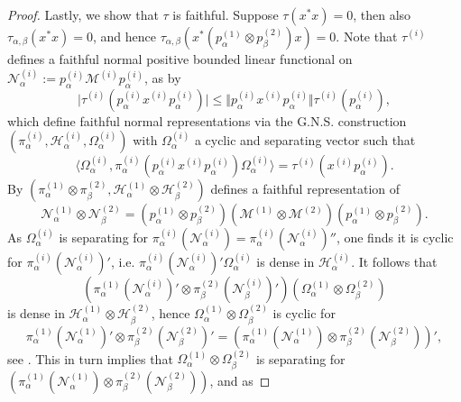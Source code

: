 \documentclass[sn-mathphys-num]{sn-jnl}%
\newcommand{\HH}{\mathcal{H}}
\newcommand{\MM}{\mathcal{M}}
\numberwithin{equation}{section}
\theoremstyle{thmstyleone}%
\theoremstyle{thmstyletwo}%
\theoremstyle{thmstylethree}%
\begin{document}
\begin{proof}
        Lastly, we show that $\tau$ is faithful. Suppose $\tau(x^*x)=0$, then also $\tau_{\alpha,\beta}(x^*x)=0$, and hence $\tau_{\alpha,\beta}(x^*(p_\alpha^{(1)}\otimes p_\beta^{(2)})x)=0$.
    Note that $\tau^{(i)}$ defines a faithful normal positive bounded linear functional on $\mathcal{N}^{(i)}_\alpha:=p_\alpha^{(i)}\MM^{(i)}p_\alpha^{(i)}$, as by \cite[Ch.\ V.2.\ Eq.\ (2)]{Takesaki2001}
    \begin{equation}
        \vert\tau^{(i)}(p_\alpha^{(i)}x^{(i)}p_\alpha^{(i)})\vert\leq \Vert p_\alpha^{(i)}x^{(i)}p_\alpha^{(i)}\Vert \tau^{(i)}(p_\alpha^{(i)}),
    \end{equation} which define faithful normal representations via the G.N.S. construction $(\pi_\alpha^{(i)},\HH_\alpha^{(i)},\Omega_\alpha^{(i)})$ with $\Omega_\alpha^{(i)}$ a cyclic and separating vector such that
    \begin{equation}
        \langle \Omega_\alpha^{(i)},\pi_\alpha^{(i)}(p_\alpha^{(i)}x^{(i)}p_\alpha^{(i)})\Omega_\alpha^{(i)}\rangle=\tau^{(i)}(x^{(i)}p_\alpha^{(i)}).
    \end{equation} By \cite[Thm.\ IV.5.2]{Takesaki2001} $(\pi_\alpha^{(1)}\otimes \pi_\beta^{(2)},\HH_\alpha^{(1)}\otimes\HH_\beta^{(2)})$ defines a faithful representation of 
    \begin{equation}
        \mathcal{N}_\alpha^{(1)}\otimes \mathcal{N}_\beta^{(2)}=(p_\alpha^{(1)}\otimes p_\beta^{(2)})(\MM^{(1)}\otimes \MM^{(2)})(p_\alpha^{(1)}\otimes p_\beta^{(2)}).
    \end{equation}
    As $\Omega_\alpha^{(i)}$ is separating for $\pi_\alpha^{(i)}(\mathcal{N}_\alpha^{(i)})=\pi_\alpha^{(i)}(\mathcal{N}_\alpha^{(i)})''$, one finds it is cyclic for $\pi_\alpha^{(i)}(\mathcal{N}_\alpha^{(i)})'$, i.e. $\pi_\alpha^{(i)}(\mathcal{N}_\alpha^{(i)})'\Omega_\alpha^{(i)}$ is dense in $\HH_\alpha^{(i)}$. It follows that 
    \begin{equation}
        (\pi_\alpha^{(1)}(\mathcal{N}_\alpha^{(i)})'\otimes \pi_\beta^{(2)}(\mathcal{N}_\beta^{(i)})')(\Omega_\alpha^{(1)}\otimes \Omega_\beta^{(2)})
    \end{equation} 
    is dense in $\HH_\alpha^{(1)}\otimes\HH_\beta^{(2)}$, hence $\Omega_\alpha^{(1)}\otimes \Omega_\beta^{(2)}$ is cyclic for 
    \begin{equation}
        \pi_\alpha^{(1)}(\mathcal{N}_\alpha^{(1)})'\otimes \pi_\beta^{(2)}
    (\mathcal{N}_\beta^{(2)})'=(\pi_\alpha^{(1)}(\mathcal{N}_\alpha^{(1)})\otimes \pi_\beta^{(2)}(\mathcal{N}_\beta^{(2)}))',
    \end{equation} see \cite[Thm.\ IV.5.9]{Takesaki2001}. This in turn implies that $\Omega_\alpha^{(1)}\otimes \Omega_\beta^{(2)}$ is separating for $(\pi_\alpha^{(1)}(\mathcal{N}_\alpha^{(1)})\otimes \pi_\beta^{(2)}(\mathcal{N}_\beta^{(2)}))$, and as

\end{proof}
\end{document}
